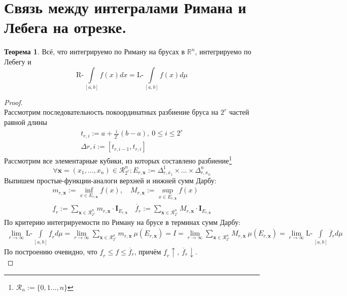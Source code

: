 \documentclass[11pt,a4paper]{report}
\def\Real{\mathbb{R}}
\theoremstyle{definition}
\theoremstyle{definition}
\newtheorem{theorem}{Теорема}[section]
\theoremstyle{definition}
\begin{document}
	\section{Связь между интегралами Римана и Лебега на отрезке.}
	\begin{theorem}
		Всё, что интегрируемо по Риману на брусах в $ \Real^{n} $, интегрируемо по Лебегу и
		\[ 
			\mbox{R-}\int\limits_{[a, b]} f(x) dx = \mbox{L-}\int\limits_{[a, b]} f(x) d\mu 
		\]
	\end{theorem}
	\begin{proof}$  $\\
		Рассмотрим последовательность покоординатных разбиение бруса на $ 2^{r} $ частей равной длины\\
		\begin{gather*}
			t_{r, i} := a + \frac{i}{2^{r}}(b - a),\ 0 \le i \le 2^{r}\\
			\Delta{r, i} := [t_{r, i-1}, t_{r, i}]
		\end{gather*}
		Рассмотрим все элементарные кубики, из которых составлено разбиение\footnote{$ \mathcal{R}_{n} := \{0, 1\dots, n\} $}
		\[
			\forall \mathbf{x} = (x_{1}, \dots, x_{n}) \in \mathcal{R}^{n}_{2^{r}} : E_{r, \mathbf{x}} := \Delta^{1}_{r, x_{1}} \times \dots \times \Delta^{n}_{r, x_{n}} 
		\]
		Выпишем простые-функции-аналоги верхней и нижней сумм Дарбу:
		\begin{gather*}
			m_{r, \mathbf{x}} := \inf\limits_{x \in E_{r, \mathbf{x}}} f(x),\quad
			M_{r, \mathbf{x}} := \sup\limits_{x \in E_{r, \mathbf{x}}} f(x)\\
			\underline{f}_{r} := \sum\limits_{\mathbf{x} \in \mathcal{R}^{n}_{2^{r}}} m_{r, \mathbf{x}} \cdot \mathbf{I}_{E_{r, \mathbf{x}}} \quad 
			\overline{f}_{r} := \sum\limits_{\mathbf{x} \in \mathcal{R}^{n}_{2^{r}}} M_{r, \mathbf{x}} \cdot \mathbf{I}_{E_{r, \mathbf{x}}}
		\end{gather*}
		По критерию интегрируемости по Риману на брусе в терминах сумм Дарбу:
		\begin{gather*}
			\lim\limits_{r\to\infty}\mbox{L-}\int\limits_{[a, b]} \underline{f}_{r} d\mu = \lim\limits_{r\to\infty} \sum\limits_{\mathbf{x} \in \mathcal{R}^{n}_{2^{r}}} m_{r, \mathbf{x}}\ \mu(E_{r, \mathbf{x}}) = I = \lim\limits_{r\to\infty} \sum\limits_{\mathbf{x} \in \mathcal{R}^{n}_{2^{r}}} M_{r, \mathbf{x}}\ \mu(E_{r, \mathbf{x}}) = \lim\limits_{r\to\infty}\mbox{L-}\int\limits_{[a, b]} \overline{f}_{r} d\mu
		\end{gather*}
		По построению очевидно, что $ \underline{f}_{r} \le f \le \overline{f}_{r} $, причём $ \underline{f}_{r} \uparrow,\ \overline{f}_{r} \downarrow $.\\

\end{proof}
\end{document}
